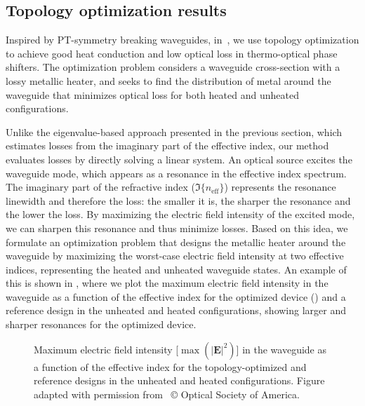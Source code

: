 \subsection*{Topology optimization results~\cite{ownpub0}}

Inspired by PT-symmetry breaking waveguides, in~\cite{ownpub0}, we use topology optimization to achieve good heat conduction and low optical loss in thermo-optical phase shifters.
The optimization problem considers a waveguide cross-section with a lossy metallic heater, and seeks to find the distribution of metal around the waveguide that minimizes optical loss for both heated and 
unheated configurations. 

Unlike the eigenvalue-based approach presented in the previous section, which estimates losses from the imaginary part of the effective index,
 our method evaluates losses by directly solving a linear system. An optical source excites the waveguide mode, which appears
  as a resonance in the effective index spectrum. The imaginary part of the refractive index ($\Im\{n_\text{eff}\}$) represents the resonance linewidth and therefore the loss:
   the smaller it is, the sharper the resonance and the lower the loss. By maximizing the electric field intensity of the excited mode,
    we can sharpen this resonance and thus minimize losses. Based on this idea, we formulate an optimization problem that designs
     the metallic heater around the waveguide by maximizing the worst-case electric field intensity at two effective indices, representing
      the heated and unheated waveguide states. An example of this is shown in , where we plot the maximum electric field intensity in the waveguide as a function of 
      the effective index for the optimized device () and a reference design in the unheated and heated configurations, showing larger and sharper resonances 
      for the optimized device.
 
      \begin{figure}[b]
         \centering
         \caption{Maximum electric field intensity [$\max(\vert \mathbf{E} \vert^2)$] in the waveguide as a function of the effective index for the topology-optimized and reference designs in the unheated and heated
         configurations. Figure adapted with permission from~\cite{ownpub0} © Optical Society of America.}
         \label{fig:therm_opt_neff}
      \end{figure}
      

